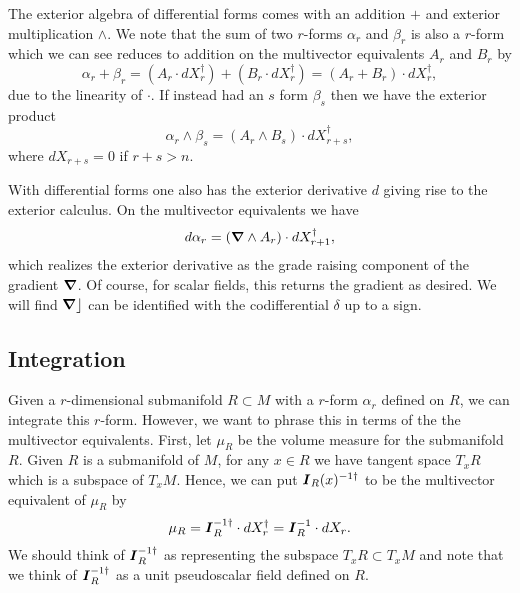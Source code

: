 The exterior algebra of differential forms comes with an addition $+$ and exterior multiplication $\wedge$.  We note that the sum of two $r$-forms $\alpha_r$ and $\beta_r$ is also a $r$-form which we can see reduces to addition on the multivector equivalents $A_r$ and $B_r$ by
\begin{equation}
\alpha_r + \beta_r = (A_r \cdot dX_r^\dagger)+(B_r \cdot dX_r^\dagger) = (A_r + B_r) \cdot dX_r^\dagger,
\end{equation}
due to the linearity of $\cdot$.  If instead had an $s$ form $\beta_s$ then we have the exterior product
\begin{equation}
\alpha_r \wedge \beta_s = (A_r \wedge B_s) \cdot dX_{r+s}^\dagger,
\end{equation}
where $dX_{r+s}=0$ if $r+s>n$.  

With differential forms one also has the exterior derivative $d$ giving rise to the exterior calculus. On the multivector equivalents we have
\begin{equation}
d \alpha_r = (\boldsymbol{\nabla} \wedge A_r) \cdot dX_{r+1}^\dagger,
\end{equation}
which realizes the exterior derivative as the grade raising component of the gradient $\boldsymbol{\nabla}$. Of course, for scalar fields, this returns the gradient as desired. We will find $\boldsymbol{\nabla} \rfloor$ can be identified with the codifferential $\delta$ up to a sign. 

\subsection{Integration}
\label{subsec:integration_on_submanifolds}

Given a $r$-dimensional submanifold $R \subset M$ with a $r$-form $\alpha_r$ defined on $R$, we can integrate this $r$-form. However, we want to phrase this in terms of the the multivector equivalents.  First, let $\mu_R$ be the volume measure for the submanifold $R$.  Given $R$ is a submanifold of $M$, for any $x \in R$ we have tangent space $T_x R$ which is a subspace of $T_x M$. Hence, we can put $\boldsymbol{I}_R(x)^{-1 \dagger}$ to be the multivector equivalent of $\mu_R$ by
\begin{equation}
\mu_R = \boldsymbol{I}_R^{-1 \dagger} \cdot dX_r^\dagger = \boldsymbol{I}_R^{-1} \cdot dX_r.
\end{equation}
We should think of $\boldsymbol{I}_R^{-1 \dagger}$ as representing the subspace $T_x R \subset T_x M$ and note that we think of $\boldsymbol{I}_R^{-1 \dagger}$ as a unit pseudoscalar field defined on $R$. 

